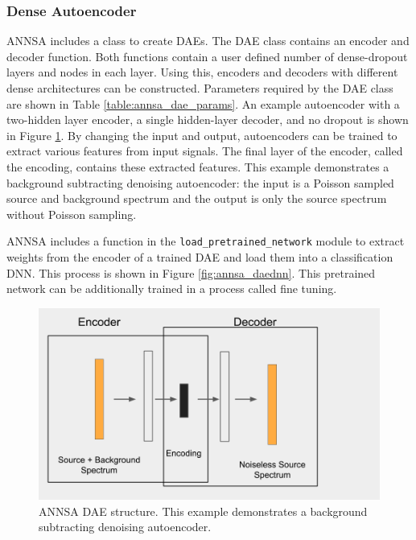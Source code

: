 \subsubsection{Dense Autoencoder}

ANNSA includes a class to create DAEs. The DAE class contains an encoder and decoder function. Both functions contain a user defined number of dense-dropout layers and nodes in each layer. Using this, encoders and decoders with different dense architectures can be constructed. Parameters required by the DAE class are shown in Table \ref{table:annsa_dae_params}. An example autoencoder with a two-hidden layer encoder, a single hidden-layer decoder, and no dropout is shown in Figure \ref{fig:annsa_dae}. By changing the input and output, autoencoders can be trained to extract various features from input signals. The final layer of the encoder, called the encoding, contains these extracted features. This example demonstrates a background subtracting denoising autoencoder: the input is a Poisson sampled source and background spectrum and the output is only the source spectrum without Poisson sampling.

ANNSA includes a function in the \verb|load_pretrained_network| module to extract weights from the encoder of a trained DAE and load them into a classification DNN. This process is shown in Figure \ref{fig:annsa_daednn}. This pretrained network can be additionally trained in a process called fine tuning.

\begin{figure}[H]
\centering
\includegraphics[trim=0 0 125 0,clip,width=0.8\linewidth]{images/annsa_dae.png}
\caption{ANNSA DAE structure. This example demonstrates a background subtracting denoising autoencoder.}
\label{fig:annsa_dae}
\end{figure}

